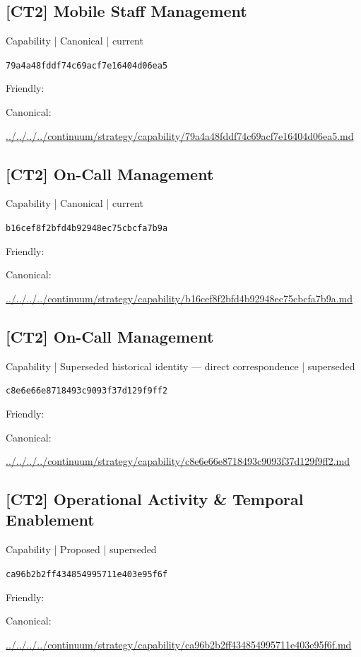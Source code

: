 \documentclass[10pt,a4paper]{article}
\begin{document}
\subsection*{[CT2] Mobile Staff Management}
{\small Capability | Canonical | current}\par
\texttt{79a4a48fddf74c69acf7e16404d06ea5}\par
Friendly: \par
Canonical: \par
{\footnotesize\url{../../../../continuum/strategy/capability/79a4a48fddf74c69acf7e16404d06ea5.md}}\par
\subsection*{[CT2] On-Call Management}
{\small Capability | Canonical | current}\par
\texttt{b16cef8f2bfd4b92948ec75cbcfa7b9a}\par
Friendly: \par
Canonical: \par
{\footnotesize\url{../../../../continuum/strategy/capability/b16cef8f2bfd4b92948ec75cbcfa7b9a.md}}\par
\subsection*{[CT2] On-Call Management}
{\small Capability | Superseded historical identity — direct correspondence | superseded}\par
\texttt{c8e6e66e8718493c9093f37d129f9ff2}\par
Friendly: \par
Canonical: \par
{\footnotesize\url{../../../../continuum/strategy/capability/c8e6e66e8718493c9093f37d129f9ff2.md}}\par
\subsection*{[CT2] Operational Activity \& Temporal Enablement}
{\small Capability | Proposed | superseded}\par
\texttt{ca96b2b2ff434854995711e403e95f6f}\par
Friendly: \par
Canonical: \par
{\footnotesize\url{../../../../continuum/strategy/capability/ca96b2b2ff434854995711e403e95f6f.md}}\par
\end{document}
